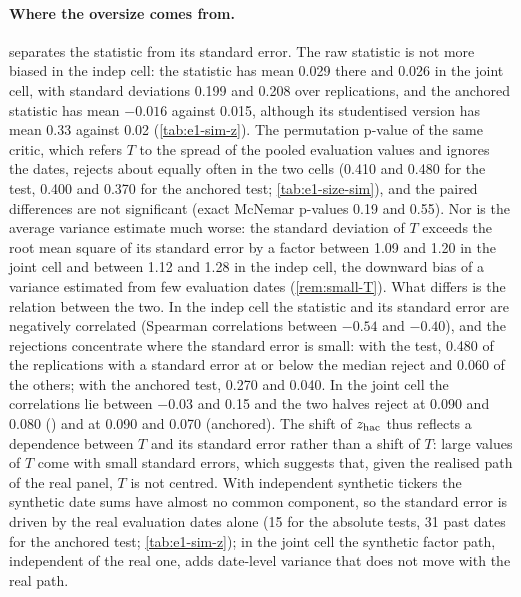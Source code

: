 \paragraph{Where the oversize comes from.}
 separates the statistic from its standard error. The raw statistic is not
more biased in the indep cell: the \WC{} statistic has mean 0.029 there and 0.026 in the joint
cell, with standard deviations 0.199 and 0.208 over replications, and the anchored statistic has
mean $-0.016$ against 0.015, although its studentised version has mean 0.33 against 0.02
(\cref{tab:e1-sim-z}). The permutation p-value of the same critic, which refers $T$ to the
spread of the pooled evaluation values and ignores the dates, rejects about equally often in the
two cells (0.410 and 0.480 for the \WC{} test, 0.400 and 0.370 for the anchored test;
\cref{tab:e1-size-sim}), and the paired differences are not significant (exact McNemar p-values
0.19 and 0.55). Nor is the average variance estimate much worse: the standard deviation of $T$
exceeds the root mean square of its standard error by a factor between 1.09 and 1.20 in the joint
cell and between 1.12 and 1.28 in the indep cell, the downward bias of a variance estimated from
few evaluation dates (\cref{rem:small-T}). What differs is the relation between the
two. In the indep cell the statistic and its standard error are negatively correlated (Spearman
correlations between $-0.54$ and $-0.40$), and the rejections concentrate where the standard error
is small: with the \WC{} test, 0.480 of the replications with a standard error at or below the
median reject and 0.060 of the others; with the anchored test, 0.270 and 0.040. In the joint cell
the correlations lie between $-0.03$ and 0.15 and the two halves reject at 0.090 and 0.080 (\WC{})
and at 0.090 and 0.070 (anchored). The shift of $z_{\mathrm{hac}}$ thus reflects a dependence between $T$ and
its standard error rather than a shift of $T$: large values of $T$ come with small standard
errors, which suggests that, given the realised path of the real panel, $T$ is not centred. With
independent synthetic tickers the synthetic date sums have almost no common component, so the
standard error is driven by the real evaluation dates alone (15 for the absolute tests, 31 past
dates for the anchored test; \cref{tab:e1-sim-z}); in the joint cell the synthetic factor path,
independent of the real one, adds date-level variance that does not move with the real path.

